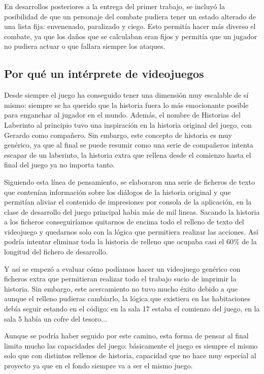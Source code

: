 \documentclass[12pt]{article}
\begin{document}
\begin{itemize}
En desarrollos posteriores a la entrega del primer trabajo, se incluyó la posibilidad de que un personaje del combate pudiera tener un estado alterado de una lista fija: envenenado, paralizado y ciego.
Esto permitía hacer más diverso el combate, ya que los daños que se calculaban eran fijos y permitía que un jugador no pudiera actuar o que fallara siempre los ataques.
\end{itemize}

\subsection{Por qué un intérprete de videojuegos}

Desde siempre el juego ha conseguido tener una dimensión muy escalable de sí mismo: siempre se ha querido que la historia fuera lo más emocionante posible para enganchar al jugador en el mundo.
Además, el nombre de Historias del Laberinto al principio tuvo una inspiración en la historia original del juego, con Gerardo como compañero. Sin embargo, este concepto de historia es muy genérico, ya que al final se puede resumir como una serie de compañeros intenta escapar de un laberinto, la historia extra que rellena desde el comienzo hasta el final del juego ya no importa tanto.

Siguiendo esta línea de pensamiento, se elaboraron una serie de ficheros de texto que contenían información sobre los diálogos de la historia original y que permitían aliviar el contenido de impresiones por consola de la aplicación, en la clase de desarrollo del juego principal había más de mil lineas.
Sacando la historia a los ficheros conseguiríamos quitarnos de encima todo el relleno de texto del videojuego y quedarnos solo con la lógica que permitiera realizar las acciones. Así podría intentar eliminar toda la historia de relleno que ocupaba casi el 60\% de la longitud del fichero de desarrollo.

Y así se empezó a evaluar cómo podíamos hacer un videojuego genérico con ficheros extra que permitieran realizar todo el trabajo sucio de imprimir la historia. Sin embargo, este acercamiento no tuvo mucho éxito debido a que aunque el relleno pudieras cambiarlo, la lógica que existiera en las habitaciones debía seguir estando en el código: en la sala 17 estaba el comienzo del juego, en la sala 5 había un cofre del tesoro...

Aunque se podría haber seguido por este camino, esta forma de pensar al final limita mucho las capacidades del juego: básicamente el juego es siempre el mismo solo que con distintos rellenos de historia, capacidad que no hace muy especial al proyecto ya que en el fondo siempre va a ser el mismo juego.
\end{document}

